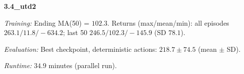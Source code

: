 \noindent\textbf{3.4_utd2}\par
\emph{Training:} Ending MA(50) = $102.3$. Returns (max/mean/min): all episodes $263.1/11.8/-634.2$; last 50 $246.5/102.3/-145.9$ (SD $78.1$).\par
\emph{Evaluation:} Best checkpoint, deterministic actions: $218.7\pm 74.5$ (mean $\pm$ SD).\par
\emph{Runtime:} $34.9$ minutes (parallel run).\par
